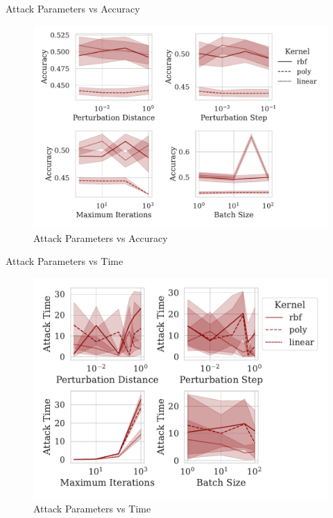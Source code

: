 \documentclass{beamer}
\begin{document}
\begin{frame}{Attack Parameters vs Accuracy}
  \begin{figure}
    \centering
    \includegraphics[width=.75\textwidth]{./generated/accuracy_vs_attack_parameters.pdf}
    \caption{Attack Parameters vs Accuracy}
  \end{figure}
  \label{fig:attack_accuracy}
\end{frame}

\begin{frame}{Attack Parameters vs Time}
  \begin{figure}
    \centering
    \includegraphics[width=.75\textwidth]{./generated/train_time_vs_attack_parameters.pdf}
    \caption{Attack Parameters vs Time}
  \end{figure}
\end{frame}
\end{document}
